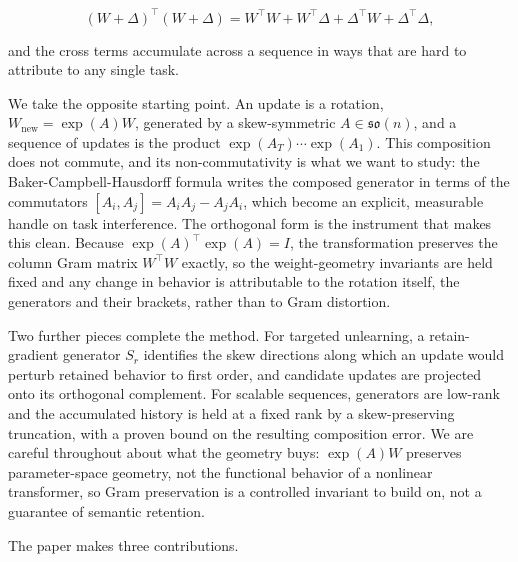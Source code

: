 \documentclass[
]{article}
\begin{document}
\[
(W+\Delta)^\top(W+\Delta)
= W^\top W + W^\top\Delta + \Delta^\top W + \Delta^\top\Delta,
\]

and the cross terms accumulate across a sequence in ways that are hard to attribute to any single task.

We take the opposite starting point. An update is a rotation, \(W_{\mathrm{new}}=\exp(A)W\), generated by a skew-symmetric \(A\in\mathfrak{so}(n)\), and a sequence of updates is the product \(\exp(A_T)\cdots\exp(A_1)\). This composition does not commute, and its non-commutativity is what we want to study: the Baker-Campbell-Hausdorff formula writes the composed generator in terms of the commutators \([A_i,A_j]=A_iA_j-A_jA_i\), which become an explicit, measurable handle on task interference. The orthogonal form is the instrument that makes this clean. Because \(\exp(A)^\top\exp(A)=I\), the transformation preserves the column Gram matrix \(W^\top W\) exactly, so the weight-geometry invariants are held fixed and any change in behavior is attributable to the rotation itself, the generators and their brackets, rather than to Gram distortion.

Two further pieces complete the method. For targeted unlearning, a retain-gradient generator \(S_r\) identifies the skew directions along which an update would perturb retained behavior to first order, and candidate updates are projected onto its orthogonal complement. For scalable sequences, generators are low-rank and the accumulated history is held at a fixed rank by a skew-preserving truncation, with a proven bound on the resulting composition error. We are careful throughout about what the geometry buys: \(\exp(A)W\) preserves parameter-space geometry, not the functional behavior of a nonlinear transformer, so Gram preservation is a controlled invariant to build on, not a guarantee of semantic retention.

The paper makes three contributions.
\end{document}
